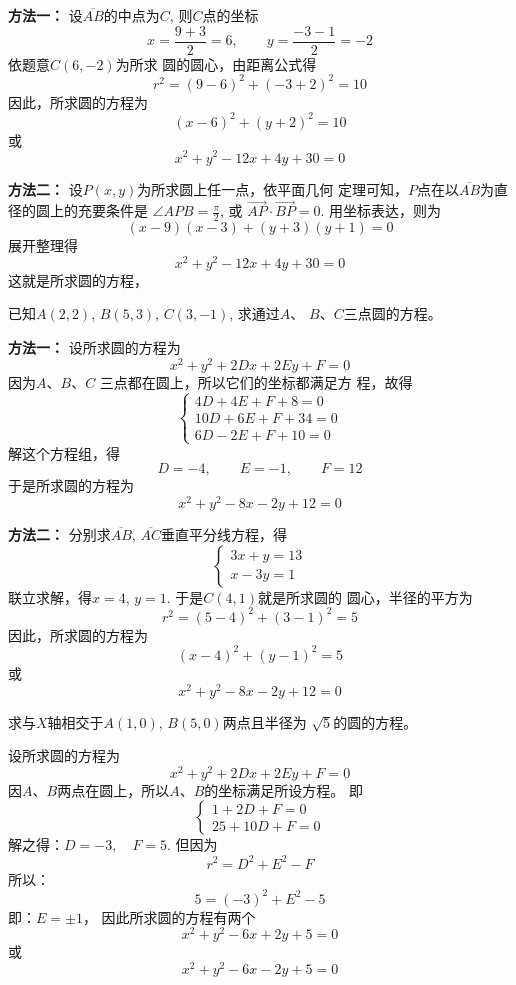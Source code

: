 \begin{solution}
\textbf{方法一：}  设$\overline{AB}$的中点为$C$, 则$C$点的坐标
\[x=\frac{9+3}{2}=6,\qquad y=\frac{-3-1}{2}=-2\]
依题意$C(6,-2)$为所求
圆的圆心，由距离公式得
\[r^2=(9-6)^2+(-3+2)^2=10\]
因此，所求圆的方程为
\[(x-6)^2+(y+2)^2=10\]
或
\[x^2+y^2-12x+4y+30=0\]

\textbf{方法二：}
 设$P(x,y)$为所求圆上任一点，依平面几何
定理可知，$P$点在以$\overline{AB}$为直径的圆上的充要条件是
$\angle APB=\frac{\pi}{2}$, 或
$\Vec{AP}\cdot \Vec{BP}=0$.
用坐标表达，则为
\[(x-9)(x-3)+(y+3)(y+1)=0\]
展开整理得
\[x^2+y^2-12x+4y+30=0\]
这就是所求圆的方程，
\end{solution}


\begin{example}
    已知$A(2,2)$, $B(5,3)$, $C(3,-1)$, 求通过$A$、
$B$、$C$三点圆的方程。
\end{example}


\begin{solution}
    \textbf{方法一：} 设所求圆的方程为
\[x^2+y^2+2Dx+2Ey+F=0\]
因为$A$、$B$、$C$ 三点都在圆上，所以它们的坐标都满足方
程，故得
\[\begin{cases}
    4D+4E+F+8=0\\
10D+6E+F+34=0\\
6D-2E+F+10=0
\end{cases}\]
解这个方程组，得
\[D=-4,\qquad E=-1,\qquad F=12\]
于是所求圆的方程为
\[x^2+y^2-8x-2y+12=0\]

\textbf{方法二：} 分别求$\overline{AB}$, $\overline{AC}$垂直平分线方程，得
\[\begin{cases}
   3x+y=13\\
x-3y=1
\end{cases}\]
联立求解，得$x=4$, $y=1$. 于是$C(4,1)$就是所求圆的
圆心，半径的平方为
\[r^2=(5-4)^2+(3-1)^2=5\]
因此，所求圆的方程为
\[(x-4)^2+(y-1)^2=5\]
或
\[x^2+y^2-8x-2y+12=0\]
\end{solution}

\begin{example}
    求与$X$轴相交于$A(1,0)$, $B(5,0)$两点且半径为
$\sqrt{5}$的圆的方程。
\end{example}

\begin{solution}
    设所求圆的方程为
\[x^2+y^2+2Dx+2Ey+F=0\]
因$A$、$B$两点在圆上，所以$A$、$B$的坐标满足所设方程。
即
\[\begin{cases}
    1+2D+F=0\\
25+10D+F=0
\end{cases}\]
解之得：$D=-3,\quad F=5$.
但因为
\[r^2=D^2+E^2-F\]
所以：
\[5=(-3)^2+E^2-5\]
即：$E=\pm 1$，
因此所求圆的方程有两个
\[x^2+y^2-6x+2y+5=0\]
或
\[x^2+y^2-6x-2y+5=0\]
\end{solution}

